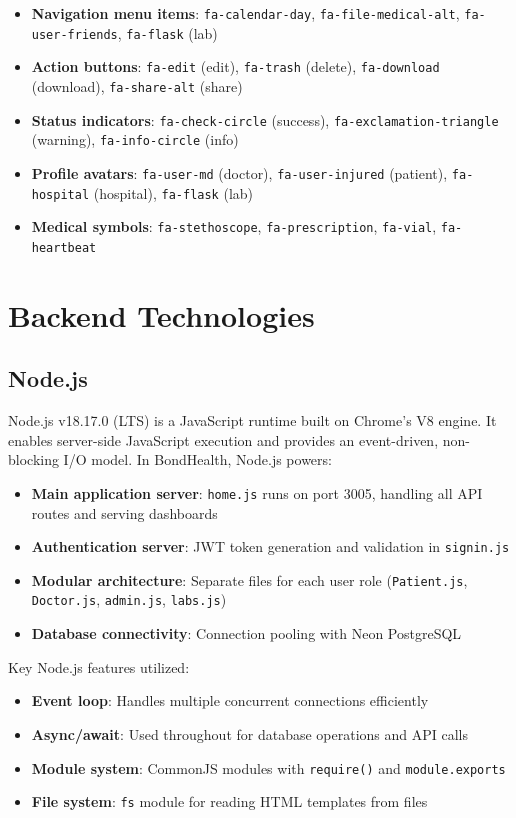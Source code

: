 \begin{itemize}
    \item \textbf{Navigation menu items}: \texttt{fa-calendar-day}, \texttt{fa-file-medical-alt}, \texttt{fa-user-friends}, \texttt{fa-flask} (lab)
    \item \textbf{Action buttons}: \texttt{fa-edit} (edit), \texttt{fa-trash} (delete), \texttt{fa-download} (download), \texttt{fa-share-alt} (share)
    \item \textbf{Status indicators}: \texttt{fa-check-circle} (success), \texttt{fa-exclamation-triangle} (warning), \texttt{fa-info-circle} (info)
    \item \textbf{Profile avatars}: \texttt{fa-user-md} (doctor), \texttt{fa-user-injured} (patient), \texttt{fa-hospital} (hospital), \texttt{fa-flask} (lab)
    \item \textbf{Medical symbols}: \texttt{fa-stethoscope}, \texttt{fa-prescription}, \texttt{fa-vial}, \texttt{fa-heartbeat}
\end{itemize}

\section{Backend Technologies}

\subsection{Node.js}
Node.js v18.17.0 (LTS) is a JavaScript runtime built on Chrome's V8 engine. It enables server-side JavaScript execution and provides an event-driven, non-blocking I/O model. In BondHealth, Node.js powers:

\begin{itemize}
    \item \textbf{Main application server}: \texttt{home.js} runs on port 3005, handling all API routes and serving dashboards
    \item \textbf{Authentication server}: JWT token generation and validation in \texttt{signin.js}
    \item \textbf{Modular architecture}: Separate files for each user role (\texttt{Patient.js}, \texttt{Doctor.js}, \texttt{admin.js}, \texttt{labs.js})
    \item \textbf{Database connectivity}: Connection pooling with Neon PostgreSQL
\end{itemize}

Key Node.js features utilized:
\begin{itemize}
    \item \textbf{Event loop}: Handles multiple concurrent connections efficiently
    \item \textbf{Async/await}: Used throughout for database operations and API calls
    \item \textbf{Module system}: CommonJS modules with \texttt{require()} and \texttt{module.exports}
    \item \textbf{File system}: \texttt{fs} module for reading HTML templates from files
\end{itemize}

